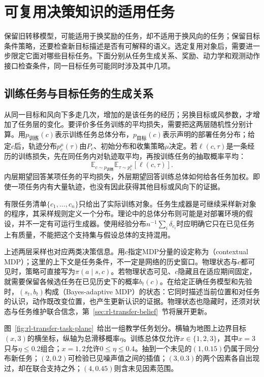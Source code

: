 \section{可复用决策知识的适用任务}
\label{sec:rl-transfer-applicability}

保留旧转移模型，可能适用于换奖励的任务，却不适用于换风向的任务；保留目标条件策略，还要检查新目标描述是否有可解释的语义。选定复用对象后，需要进一步限定它面对哪些目标任务。下面分别从任务生成关系、奖励、动力学和观测动作接口检查条件，同一目标任务可能同时涉及其中几项。

\subsection{训练任务与目标任务的生成关系}
\label{sec:rl-transfer-distributions}

从同一目标和风向下多走几次，增加的是该任务的经历；另换目标或风参数，才增加了任务层的变化。要评价多任务训练的平均损失，需要把这两层随机性分别计算。用$p_{\text{训练}}(c)$表示训练任务总体分布，$p_{\text{目标}}(c)$表示声明的部署任务分布；给定$c$后，轨迹分布$p_c^\mu(\tau)$由$P_c$、初始分布和收集策略$\mu$决定。若$\ell(c,\tau)$是一条经历的训练损失，先在同任务内对轨迹取平均，再按训练任务的抽取概率平均：
\[
  \mathbb E_{c\sim p_{\text{训练}}}
  \mathbb E_{\tau\sim p_c^\mu}[\ell(c,\tau)].
\]
内层期望回答某项任务的平均损失，外层期望回答训练总体如何给各任务加权。即使一项任务内有大量轨迹，也没有因此获得其他目标或风向下的证据。

有限任务清单$\{c_1,\ldots,c_n\}$只给出了实际训练对象。任务生成器是可继续采样新对象的程序，其采样规则定义一个分布。理论中的总体分布则可能是对部署环境的假设，并不一定有可运行生成器。使用经验分布$n^{-1}\sum_i\delta_{c_i}$时应明确它只在已见任务上有质量，不能把这个支持集与假设总体的支持混用。

上述两层采样也对应两类决策信息。用$c$指定MDP分量的设定称为（contextual MDP）；这里的上下文是任务条件，不一定是网络的历史窗口。物理状态与$c$都可见时，策略可直接写为$\pi(a\mid s,c)$。若物理状态可见、$c$隐藏且在适应期间固定，就需要保留各候选任务在已见历史下的概率$b_t(c)$。在给定正确任务模型和先验时，$(s_t,b_t)$构成（Bayes-adaptive MDP）的状态：它同时描述当前位置和对任务的认识，动作既改变位置，也产生更新认识的证据。物理状态也隐藏时，还须对状态与任务维护联合信念，第~\ref{sec:rl-transfer-belief}~节将展开更新。

图~\ref{fig:rl-transfer-task-plane}~给出一组教学任务划分。横轴为地图上边界目标$(x,3)$的横坐标，纵轴为总滑移概率$\eta$。训练总体仅允许$x\in\{1,2,3\}$，其中$x=3$只与$\eta\leq0.2$组合；$x=1,2$允许$0\leq\eta\leq0.4$。抽到一个未见的$(1,0.15)$仍属于同分布新任务；$(2,0.2)$可检验已见噪声值之间的插值；$(3,0.3)$的两个因素各自出现过，却在联合支持之外；$(4,0.45)$则含未见因素范围。

